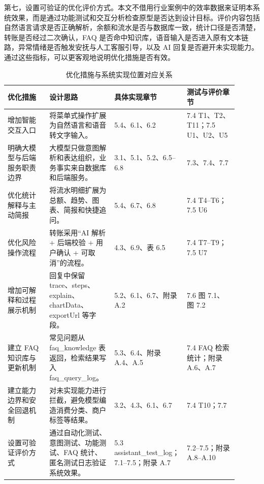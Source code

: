 \documentclass[bachelor, print]{xduthesis}
\begin{document}
第七，设置可验证的优化评价方式。本文不借用行业案例中的效率数据来证明本系统效果，而是通过功能测试和交互分析检查原型是否达到设计目标。评价内容包括自然语言请求是否正确解析，余额和流水是否与数据库一致，统计口径是否清楚，转账是否经过二次确认，FAQ 是否命中知识库，语音输入是否进入原有文本链路，异常情绪是否触发安抚与人工客服引导，以及 AI 回复是否避开未实现能力。通过这些指标，可以更客观地说明优化措施是否有效。

\begin{table}[H]
    \centering
    \caption{优化措施与系统实现位置对应关系}
    \label{tab:optimization-implementation-map}
    \scriptsize
    \setlength{\tabcolsep}{2pt}
    \renewcommand{\arraystretch}{1.15}
    \begin{tabular}{|p{0.18\linewidth}|p{0.28\linewidth}|p{0.22\linewidth}|p{0.22\linewidth}|}
        \hline
        优化措施 & 设计思路 & 具体实现章节 & 测试与评价章节 \\
        \hline
        增加智能交互入口 & 将菜单式操作扩展为自然语言和语音转文字输入。 & 5.4、6.1、6.2 & 7.4 T1、T2、T11；7.5 U1、U2、U5 \\
        \hline
        明确大模型与后端服务职责边界 & 大模型只做意图解析和表达组织，业务事实来自数据库和后端服务。 & 3.1、5.1、5.2、6.5--6.8 & 7.3、7.4、7.7 \\
        \hline
        优化统计解释与主动简报 & 将流水明细扩展为总额、趋势、图表、简报和快捷追问。 & 5.4、6.7、6.8 & 7.4 T4--T6；7.5 U6 \\
        \hline
        优化风险操作流程 & 转账采用“AI 解析 + 后端校验 + 用户确认 + 可取消”的流程。 & 4.3、6.9、表 6.5 & 7.4 T7--T9；7.5 U7 \\
        \hline
        增加可解释和过程展示机制 & 回复中保留 trace、steps、explain、chartData、exportUrl 等字段。 & 5.2、6.1、6.7、附录 A.2 & 7.6 图 7.1、图 7.2 \\
        \hline
        建立 FAQ 知识库与更新机制 & 常见问题从 faq\_knowledge 表返回，检索结果写入 faq\_query\_log。 & 5.3、6.4、附录 A.4、A.5 & 7.4 FAQ 检索统计；附录 A.6、A.7 \\
        \hline
        建立能力边界和安全回退机制 & 对未实现能力进行拦截，避免模型编造消费分类、商户标签等结果。 & 3.2、4.3、6.1、6.7 & 7.4 T10；7.7 \\
        \hline
        设置可验证评价方式 & 通过自动化测试、意图测试、功能测试、FAQ 统计、匿名测试日志验证系统效果。 & 5.3 assistant\_test\_log；7.1--7.5；附录 A.7 & 7.2--7.5；附录 A.8--A.10 \\
        \hline
    \end{tabular}
\end{table}
\end{document}
